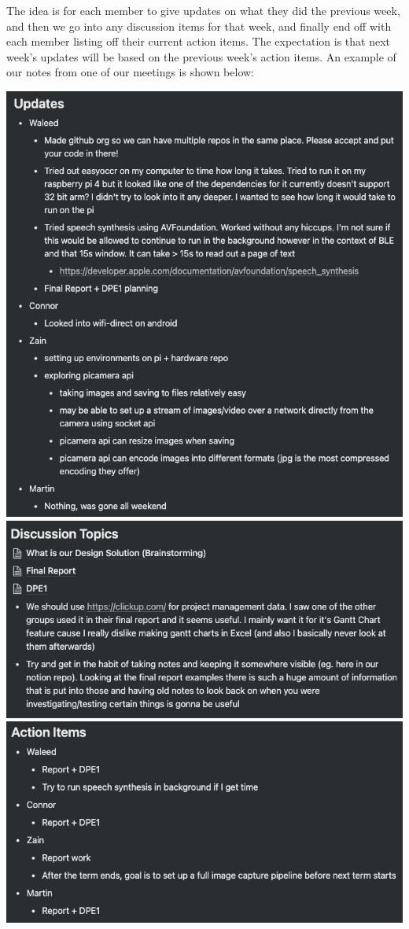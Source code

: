 \documentclass[a4paper,11pt]{article}
\begin{document}
The idea is for each member to give updates on what they did the previous week, and then we go into any discussion items for that week, and finally end off with each member listing off their current action items. The expectation is that next week's updates will be based on the previous week's action items. An example of our notes from one of our meetings is shown below:
\begin{center}
    \includegraphics[width={0.5\linewidth}]{img/notion/Aug3_Updates.png} \\
    \includegraphics[width={0.45\linewidth}]{img/notion/Aug3_Discussion.png}
    \includegraphics[width={0.45\linewidth}]{img/notion/Aug3_Action.png}
\end{center}
\end{document}
